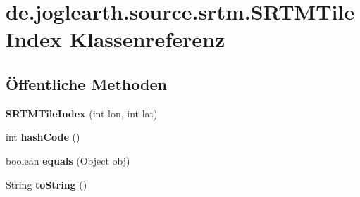 \section{de.\-joglearth.\-source.\-srtm.\-S\-R\-T\-M\-Tile\-Index Klassenreferenz}
\label{classde_1_1joglearth_1_1source_1_1srtm_1_1_s_r_t_m_tile_index}
\subsection*{Öffentliche Methoden}
\begin{DoxyCompactItemize}
\item 
{\bfseries S\-R\-T\-M\-Tile\-Index} (int lon, int lat)\label{classde_1_1joglearth_1_1source_1_1srtm_1_1_s_r_t_m_tile_index_a180a33eeceb0625e2316fed667d814e7}

\item 
int {\bfseries hash\-Code} ()\label{classde_1_1joglearth_1_1source_1_1srtm_1_1_s_r_t_m_tile_index_a7e154c052887eb7034ecd6cbbc33f397}

\item 
boolean {\bfseries equals} (Object obj)\label{classde_1_1joglearth_1_1source_1_1srtm_1_1_s_r_t_m_tile_index_a52a8ebdf041830445c73ae272543e91a}

\item 
String {\bfseries to\-String} ()\label{classde_1_1joglearth_1_1source_1_1srtm_1_1_s_r_t_m_tile_index_a4c7b4e394776d048c9a2acf68de94638}

\end{DoxyCompactItemize}
